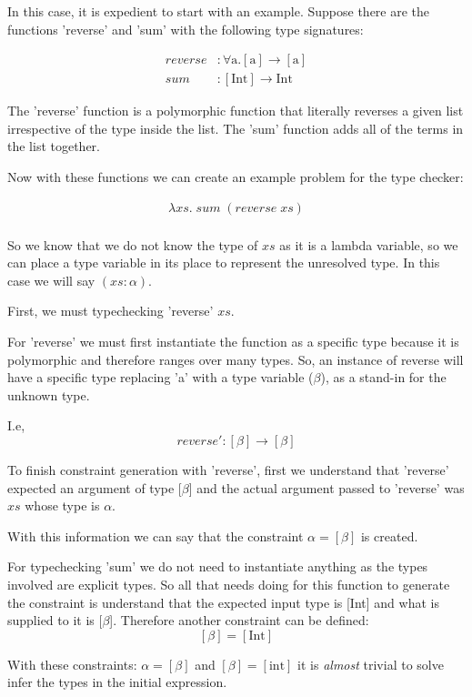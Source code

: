 \documentclass{l4proj}
\begin{document}
In this case, it is expedient to start with an example.
Suppose there are the functions 'reverse' and 'sum' with the following type signatures:

\begin{align*}
    \mathit{reverse} &: \forall \text{a} . [\text{a}] \rightarrow [\text{a}] \\
    \mathit{sum} &: [\text{Int}] \rightarrow \text{Int}
\end{align*}

The 'reverse' function is a polymorphic function that literally reverses a given list irrespective of the type inside the list.
The 'sum' function adds all of the terms in the list together.

Now with these functions we can create an example problem for the type checker:

\begin{align*}
    \lambda xs . \; \mathit{sum} \; (\mathit{reverse} \; xs) \\
\end{align*}

So we know that we do not know the type of $xs$ as it is a lambda variable, so we can place a type variable in its place to represent the unresolved type.
In this case we will say $(xs : \alpha)$.

First, we must typechecking 'reverse' $xs$.

For 'reverse' we must first instantiate the function as a specific type because it is polymorphic and therefore ranges over many types.
So, an instance of reverse will have a specific type replacing 'a' with a type variable ($\beta$), as a stand-in for the unknown type.

I.e, \[reverse' : [\beta] \rightarrow [\beta]\]


To finish constraint generation with 'reverse', first we understand that 'reverse' expected an argument of type [$\beta$] and the actual argument passed to 'reverse' was $xs$ whose type is $\alpha$.

With this information we can say that the constraint $\alpha = [\beta]$ is created.

For typechecking 'sum' we do not need to instantiate anything as the types involved are explicit types.
So all that needs doing for this function to generate the constraint is understand that the expected input type is [Int] and what is supplied to it is [$\beta$].
Therefore another constraint can be defined:
\[[\beta] = [\text{Int}]\]

With these constraints: $\alpha = [\beta]$ and $[\beta] = [\text{int}]$ it is \emph{almost} trivial to solve infer the types in the initial expression.
\end{document}

